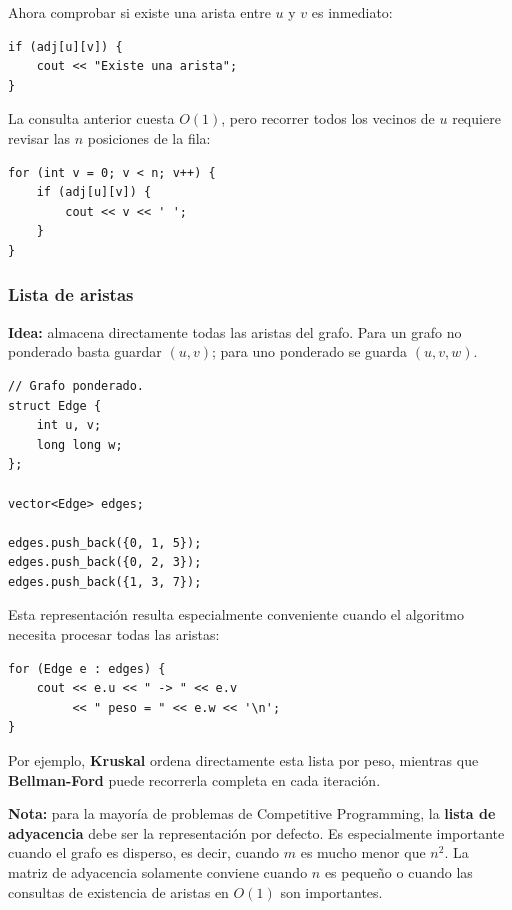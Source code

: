 \documentclass[10pt,a4paper,twocolumn]{article}
\begin{document}
Ahora comprobar si existe una arista entre $u$ y $v$ es inmediato:

\begin{lstlisting}[style=cpp]
if (adj[u][v]) {
    cout << "Existe una arista";
}
\end{lstlisting}

La consulta anterior cuesta $O(1)$, pero recorrer todos los vecinos de
$u$ requiere revisar las $n$ posiciones de la fila:

\begin{lstlisting}[style=cpp]
for (int v = 0; v < n; v++) {
    if (adj[u][v]) {
        cout << v << ' ';
    }
}
\end{lstlisting}

\subsubsection{Lista de aristas}

\textbf{Idea:} almacena directamente todas las aristas del grafo.
Para un grafo no ponderado basta guardar $(u,v)$; para uno ponderado
se guarda $(u,v,w)$.

\begin{lstlisting}[style=cpp]
// Grafo ponderado.
struct Edge {
    int u, v;
    long long w;
};

vector<Edge> edges;

edges.push_back({0, 1, 5});
edges.push_back({0, 2, 3});
edges.push_back({1, 3, 7});
\end{lstlisting}

Esta representación resulta especialmente conveniente cuando el
algoritmo necesita procesar todas las aristas:

\begin{lstlisting}[style=cpp]
for (Edge e : edges) {
    cout << e.u << " -> " << e.v
         << " peso = " << e.w << '\n';
}
\end{lstlisting}

Por ejemplo, \textbf{Kruskal} ordena directamente esta lista por peso,
mientras que \textbf{Bellman-Ford} puede recorrerla completa en cada
iteración.

\textbf{Nota:} para la mayoría de problemas de Competitive Programming,
la \textbf{lista de adyacencia} debe ser la representación por defecto.
Es especialmente importante cuando el grafo es disperso, es decir,
cuando $m$ es mucho menor que $n^2$. La matriz de adyacencia solamente
conviene cuando $n$ es pequeño o cuando las consultas de existencia de
aristas en $O(1)$ son importantes.
\end{document}
